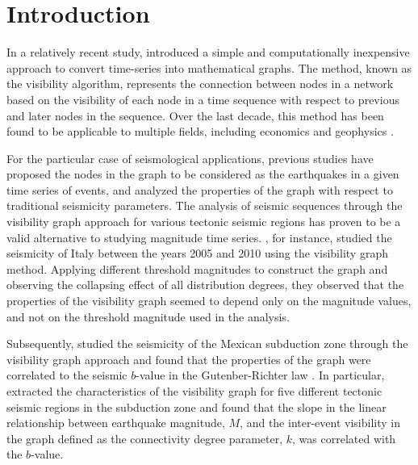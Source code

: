 
\section{Introduction}

In a relatively recent study, \citet{Lacasa2008} introduced a simple and computationally inexpensive approach to convert time-series into mathematical graphs. The method, known as the visibility algorithm, represents the connection between nodes in a network based on the visibility of each node in a time sequence with respect to previous and later nodes in the sequence. Over the last decade, this method has been found to be applicable to multiple fields, including economics and geophysics \citep[e.g.,][]{Telesca2012_CSF, Long2013, Wang2012}. 

For the particular case of seismological applications, previous studies have proposed the nodes in the graph to be considered as the earthquakes in a given time series of events, and analyzed the properties of the graph with respect to traditional seismicity parameters. The analysis of seismic sequences through the visibility graph approach for various tectonic seismic regions has proven to be a valid alternative to studying magnitude time series. \citet{Telesca2012}, for instance, studied the seismicity of Italy between the years 2005 and 2010 using the visibility graph method. Applying different threshold magnitudes to construct the graph and observing the collapsing effect of all distribution degrees, they observed that the properties of the visibility graph seemed to depend only on the magnitude values, and not on the threshold magnitude used in the analysis. 

Subsequently, \citet{Telesca2013} studied the seismicity of the Mexican subduction zone through the visibility graph approach and found that the properties of the graph were correlated to the seismic $b$-value in the Gutenber-Richter law \citep{Gutenberg1944}. In particular, \citet{Telesca2013} extracted the characteristics of the visibility graph for five different tectonic seismic regions in the subduction zone and found that the slope in the linear relationship between earthquake magnitude, $M$, and the inter-event visibility in the graph defined as the connectivity degree parameter, $k$, was correlated with the $b$-value.

